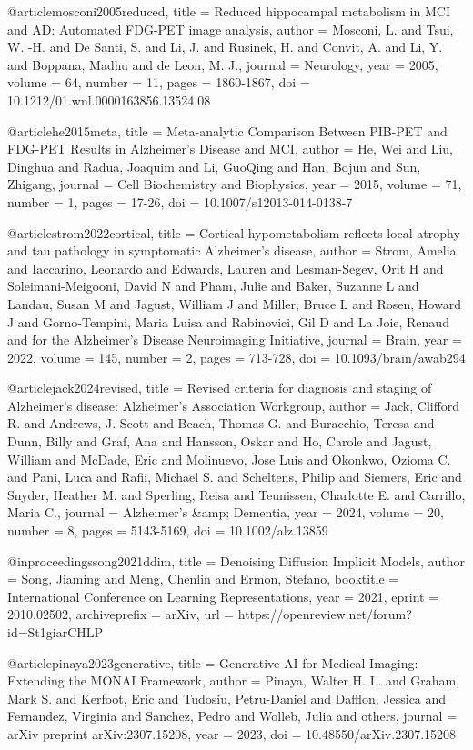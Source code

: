 @article{mosconi2005reduced,
  title = {Reduced hippocampal metabolism in MCI and AD: Automated FDG-PET image analysis},
  author = {Mosconi, L. and Tsui, W. -H. and De Santi, S. and Li, J. and Rusinek, H. and Convit, A. and Li, Y. and Boppana, Madhu and de Leon, M. J.},
  journal = {Neurology},
  year = {2005},
  volume = {64},
  number = {11},
  pages = {1860-1867},
  doi = {10.1212/01.wnl.0000163856.13524.08}
}

@article{he2015meta,
  title = {Meta-analytic Comparison Between PIB-PET and FDG-PET Results in Alzheimer’s Disease and MCI},
  author = {He, Wei and Liu, Dinghua and Radua, Joaquim and Li, GuoQing and Han, Bojun and Sun, Zhigang},
  journal = {Cell Biochemistry and Biophysics},
  year = {2015},
  volume = {71},
  number = {1},
  pages = {17-26},
  doi = {10.1007/s12013-014-0138-7}
}

@article{strom2022cortical,
  title = {Cortical hypometabolism reflects local atrophy and tau pathology in symptomatic Alzheimer’s disease},
  author = {Strom, Amelia and Iaccarino, Leonardo and Edwards, Lauren and Lesman-Segev, Orit H and Soleimani-Meigooni, David N and Pham, Julie and Baker, Suzanne L and Landau, Susan M and Jagust, William J and Miller, Bruce L and Rosen, Howard J and Gorno-Tempini, Maria Luisa and Rabinovici, Gil D and La Joie, Renaud and {for the Alzheimer’s Disease Neuroimaging Initiative}},
  journal = {Brain},
  year = {2022},
  volume = {145},
  number = {2},
  pages = {713-728},
  doi = {10.1093/brain/awab294}
}

@article{jack2024revised,
  title = {Revised criteria for diagnosis and staging of Alzheimer's disease: Alzheimer's Association Workgroup},
  author = {Jack, Clifford R. and Andrews, J. Scott and Beach, Thomas G. and Buracchio, Teresa and Dunn, Billy and Graf, Ana and Hansson, Oskar and Ho, Carole and Jagust, William and McDade, Eric and Molinuevo, Jose Luis and Okonkwo, Ozioma C. and Pani, Luca and Rafii, Michael S. and Scheltens, Philip and Siemers, Eric and Snyder, Heather M. and Sperling, Reisa and Teunissen, Charlotte E. and Carrillo, Maria C.},
  journal = {Alzheimer's \&amp; Dementia},
  year = {2024},
  volume = {20},
  number = {8},
  pages = {5143-5169},
  doi = {10.1002/alz.13859}
}

@inproceedings{song2021ddim,
 title = {Denoising Diffusion Implicit Models},
 author = {Song, Jiaming and Meng, Chenlin and Ermon, Stefano},
 booktitle = {International Conference on Learning Representations},
 year = {2021},
 eprint = {2010.02502},
 archiveprefix = {arXiv},
 url = {https://openreview.net/forum?id=St1giarCHLP}
}

@article{pinaya2023generative,
 title = {Generative AI for Medical Imaging: Extending the MONAI Framework},
 author = {Pinaya, Walter H. L. and Graham, Mark S. and Kerfoot, Eric and Tudosiu, Petru-Daniel and Dafflon, Jessica and Fernandez, Virginia and Sanchez, Pedro and Wolleb, Julia and others},
 journal = {arXiv preprint arXiv:2307.15208},
 year = {2023},
 doi = {10.48550/arXiv.2307.15208}
}

